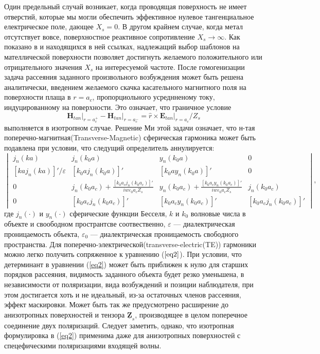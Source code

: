 \documentclass[12pt,a4paper]{article}
\begin{document}
Один предельный случай возникает, когда проводящая поверхность не имеет отверстий, которые мы могли
обеспечить эффективное нулевое тангенциальное електрическое поле, дающее $X_s = 0$. В другом крайнем
случае, когда метал отсутствует вовсе, поверхностное 
реактивное сопротивление $X_s \to \infty$.
Как показано в \cite{14} и находящихся в ней ссылках, надлежащий выбор шаблонов на мателлической
поверхности позволяет достигнуть желаемого положительного или отрицательного значения $X_s$ на 
интересуемой частоте. После гомогенизации задача рассеяния заданного произвольного возбуждения может
быть решена аналитически, введением желаемого скачка касательного магнитного поля на поверхности плаща
в $r=a_c$, пропорциольного усреднненому току, индуцированному на поверхности. Это означает, что граничное
условие 
\begin{equation}
\left.\textbf{H}_{tan}\right|_{r=a_c^+} - \left.\textbf{H}_{tan}\right|_{r=a_c^-} = 
\hat{r} \times \left.\textbf{E}_{tan}\right|_{r=a_c} / Z_s
\end{equation} 	
выполняется в изотропном случае. Решение Ми этой задачи означает, что н-тая 
поперечно-магнитная(Transverse-Magnetic) сферическая гармоника может быть подавлена при условии,
что следущий определитель аннулируется:
\begin{equation}\label{eq2}
\begin{vmatrix}
j_n(ka) & j_n(k_0a) & y_n(k_0a) & 0\\
[kaj_n(ka)]'/\varepsilon & [k_0aj_n(k_0a)]' & [k_0ay_n(k_0a)]' & 0\\
0 & j_n(k_0a_c)+\frac{[k_0a_cj_n(k_0a_c)]'}{iw\varepsilon_0a_cZ_s} &
y_n(k_0a_c) + \frac{[k_0a_cy_n(k_0a_c)]'}{iw\varepsilon_0a_cZ_s} & j_n(k_0a_c)\\
0 & [k_0a_cj_n(k_0a_c)]' & [k_0a_cy_n(k_0a_c)]' & [k_0a_cj_n(k_0a_c)]'
\end{vmatrix},
\end{equation}
где $j_n(\cdot)$ и $y_n(\cdot)$ сферические функции Бесселя, $k$ и $k_0$ волновые числа в объекте и
своободном пространтсве соотвественно, $\varepsilon$ --- диалектрическая проницаемость объекта,
$\varepsilon_0$ --- диалектрическая проницаемость свободного пространства.
Для поперечно-электрической(transverse-electric(TE)) гармоники можно легко 
получить сопряженное к уравнению ($\ref{eq2}$). При условии, что детерминант в уравнении 
(\ref{eq2}) может быть приближен к нулю для старших порядков рассеяния, видимость заданного
объекта будет резко уменьшена, в независимости от поляризации, вида возбуждений и позиции
наблюдателя, при этом достигается хоть и не идеальный, из-за остаточных членов рассеяния,
эффект маскировки. Может быть так же предусмотрено расширение до анизотропных поверхностей
и тензора $\underline{\textbf{Z}}_s$, производящее в целом поперечное соединение двух 
поляризаций. Следует заметить, однако, что изотропная формулировка в (\ref{eq2}) применима
даже для анизотропных поверхностей с спецефическими поляризациями входящей волны.
\end{document}
